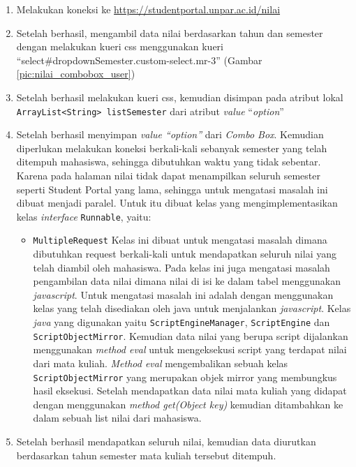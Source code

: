 \begin{enumerate}
	\item Melakukan koneksi ke \url{https://studentportal.unpar.ac.id/nilai}
	\item Setelah berhasil, mengambil data nilai berdasarkan tahun dan semester dengan melakukan kueri css menggunakan kueri ``select\#dropdownSemester.custom-select.mr-3'' (Gambar \ref{pic:nilai_combobox_user})
	\item Setelah berhasil melakukan kueri css, kemudian disimpan pada atribut lokal \texttt{ArrayList<String> listSemester} dari atribut \textit{value} ``\textit{option}''
	\item Setelah berhasil menyimpan \textit{value ``option''} dari \textit{Combo Box}. Kemudian diperlukan melakukan koneksi berkali-kali sebanyak semester yang telah ditempuh mahasiswa, sehingga dibutuhkan waktu yang tidak sebentar. Karena pada halaman nilai tidak dapat menampilkan seluruh semester seperti Student Portal yang lama, sehingga untuk mengatasi masalah ini dibuat menjadi paralel. Untuk itu dibuat kelas yang mengimplementasikan kelas \textit{interface} \texttt{Runnable}, yaitu:
	\begin{itemize}
		\item \texttt{MultipleRequest}
		Kelas ini dibuat untuk mengatasi masalah dimana dibutuhkan request berkali-kali untuk mendapatkan seluruh nilai yang telah diambil oleh mahasiswa. Pada kelas ini juga mengatasi masalah pengambilan data nilai dimana nilai di isi ke dalam tabel menggunakan \textit{javascript}. Untuk mengatasi masalah ini adalah dengan menggunakan kelas yang telah disediakan oleh java untuk menjalankan \textit{javascript}. Kelas \textit{java} yang digunakan yaitu \texttt{ScriptEngineManager}, \texttt{ScriptEngine} dan \texttt{ScriptObjectMirror}. Kemudian data nilai yang berupa script dijalankan menggunakan \textit{method eval} untuk mengeksekusi script yang terdapat nilai dari mata kuliah. \textit{Method eval} mengembalikan sebuah kelas \texttt{ScriptObjectMirror} yang merupakan objek mirror yang membungkus hasil eksekusi. Setelah mendapatkan data nilai mata kuliah yang didapat dengan menggunakan \textit{method get(Object key)} kemudian ditambahkan ke dalam sebuah list nilai dari mahasiswa.
	\end{itemize}
	\item Setelah berhasil mendapatkan seluruh nilai, kemudian data diurutkan berdasarkan tahun semester mata kuliah tersebut ditempuh.
\end{enumerate}

